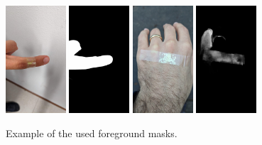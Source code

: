 \documentclass[10pt]{book}
\begin{document}
\begin{figure}
  \centering
     {\includegraphics[width=0.2\textwidth]{image/foreground_mask_example_finger}}
     {\includegraphics[width=0.2\textwidth]{image/foreground_mask_example_finger_mask}}
     {\includegraphics[width=0.2\textwidth]{image/foreground_mask_example_hand}}
     {\includegraphics[width=0.2\textwidth]{image/foreground_mask_example_hand_mask}}
  \caption{Example of the used foreground masks.}
  \label{fig:foreground_mask_examples}
\end{figure}
\end{document}
